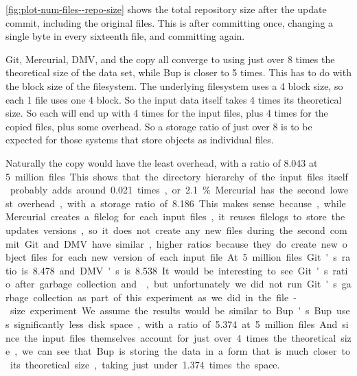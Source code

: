 %


\autoref{fig:plot-num-files--repo-size} shows the total \gls{repository} size
after the update commit, including the original files. This is after committing
once, changing a single byte in every sixteenth file, and committing again.

Git, Mercurial, DMV, and the copy all converge to using just over \num{8} times
the theoretical size of the data set, while Bup is closer to \num{5} times. This
has to do with the block size of the filesystem. The underlying filesystem uses
a \SI{4}{\kib} block size, so each \SI{1}{\kib} file uses one \SI{4}{\kib}
block. So the input data itself takes \num{4} times its theoretical size. So
each will end up with \num{4} times for the input files, plus \num{4} times for
the copied files, plus some overhead. So a storage ratio of just over \num{8} is
to be expected for those systems that store objects as individual files.

Naturally the copy would have the least overhead, with a ratio of \num{8.043} at
\SI{5} million files. This shows that the directory hierarchy of the input files
itself probably adds around \num{0.021} times, or \SI{2.1}{\percent}. Mercurial
has the second lowest overhead, with a storage ratio of \num{8.186}. This makes
sense because, while Mercurial creates a \gls{filelog} for each input files, it
reuses \glspl{filelog} to store the updates versions, so it does not create any
new files during the second commit.

Git and \gls{DMV} have similar, higher ratios because they do create new object
files for each new version of each input file. At \SI{5} million files Git's
ratio is \num{8.478} and \gls{DMV}'s is \num{8.538}. It would be interesting to
see Git's ratio after garbage collection and , but
unfortunately we did not run Git's garbage collection as part of this experiment
as we did in the file-size experiment. We assume the results would be similar to
Bup's.

Bup uses significantly less disk space, with a ratio of \num{5.374} at \num{5}
million files. And since the input files themselves account for just over
\num{4} times the theoretical size, we can see that Bup is storing the data in a
form that is much closer to its theoretical size, taking just under \num{1.374}
times the space.

%
